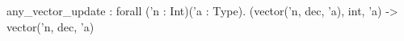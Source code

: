 any_vector_update : forall ('n : Int)('a : Type). (vector('n, dec, 'a), int, 'a) -> vector('n, dec, 'a)
